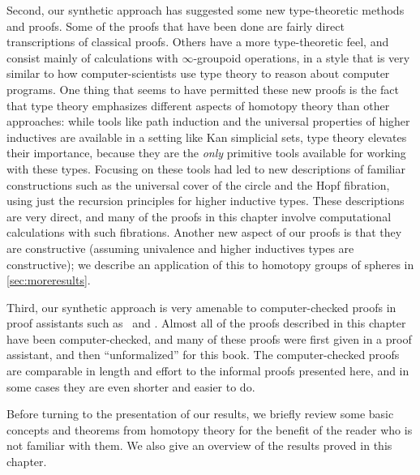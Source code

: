 Second, our synthetic approach has suggested some new type-theoretic
methods and proofs.  Some of the proofs that  have been done are fairly
direct transcriptions of classical proofs.  Others have a more
type-theoretic feel, and consist mainly of calculations with
$\infty$-groupoid operations, in a style that is very similar to how
computer-scientists use type theory to reason about computer programs.
One thing that seems to have permitted these new proofs is the fact that type theory
emphasizes different aspects of homotopy theory than other approaches:
while tools like path induction and the universal properties of higher
inductives are available in a setting like Kan simplicial sets, type
theory elevates their importance, because they are the \emph{only}
primitive tools available for working with these types.  Focusing on
these tools had led to new descriptions of familiar constructions such
as the universal cover of the circle and the Hopf fibration, using just the
recursion principles for higher inductive types.  These descriptions are
very direct, and many of the proofs in this chapter involve
computational calculations with such fibrations.
Another new aspect of our proofs is that they are constructive (assuming
univalence and higher inductives types are constructive); we describe an
application of this to homotopy groups of spheres in
\cref{sec:moreresults}.    

Third, our synthetic approach is very amenable to computer-checked
proofs in proof assistants such as \Coq\ and \Agda.  Almost all of the proofs
described in this chapter have been computer-checked, and many of these
proofs were first given in a proof assistant, and then ``unformalized''
for this book.  The computer-checked proofs are comparable in length and
effort to the informal proofs presented here, and in some cases they are
even shorter and easier to do.  

\mentalpause

Before turning to the presentation of our results, we briefly review some
 basic concepts and theorems from homotopy theory for the benefit of the reader who is not familiar with them.
 We also give an overview of the
results proved in this chapter.  

